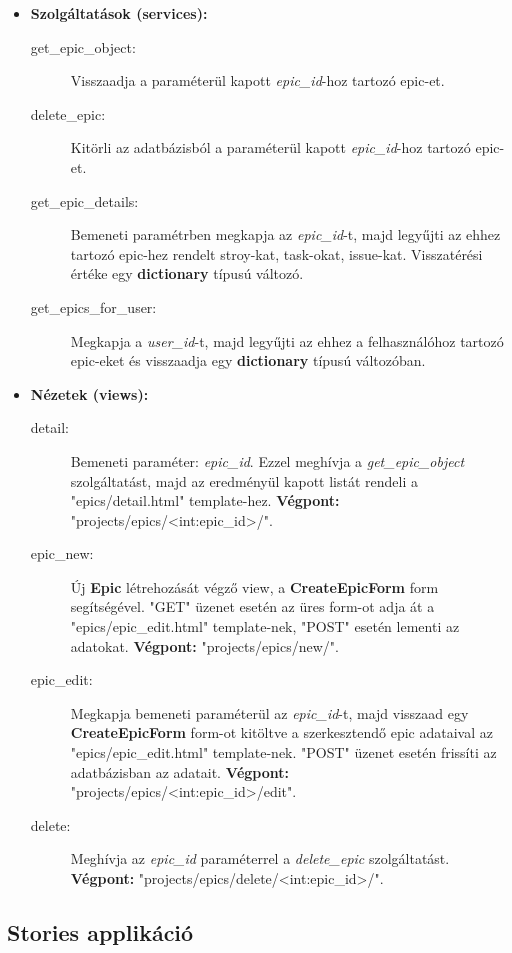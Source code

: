 \begin{itemize}
	\item \textbf{Szolgáltatások (services):}
	\begin{description}
		\item[get\_epic\_object:] Visszaadja a paraméterül kapott \textit{epic\_id}-hoz tartozó epic-et.
		\item[delete\_epic:] Kitörli az adatbázisból a paraméterül kapott \textit{epic\_id}-hoz tartozó epic-et.
		\item[get\_epic\_details:] Bemeneti paramétrben megkapja az  \textit{epic\_id}-t, majd legyűjti az ehhez tartozó epic-hez rendelt stroy-kat, task-okat, issue-kat. Visszatérési értéke egy \textbf{dictionary} típusú változó.
		\item[get\_epics\_for\_user:] Megkapja a \textit{user\_id}-t, majd legyűjti az ehhez a felhasználóhoz tartozó epic-eket és visszaadja egy \textbf{dictionary} típusú változóban.
	\end{description}
	\item \textbf{Nézetek (views):}
	\begin{description}
		\item[detail:] Bemeneti paraméter: \textit{epic\_id}. Ezzel meghívja a \textit{get\_epic\_object} szolgáltatást, majd az eredményül kapott listát rendeli a "epics/detail.html" template-hez. \textbf{Végpont:} "projects/epics/<int:epic\_id>/".
		\item[epic\_new:] Új \textbf{Epic} létrehozását végző view, a \textbf{CreateEpicForm} form segítségével. "GET" üzenet esetén az üres form-ot adja át a "epics/epic\_edit.html" template-nek, "POST" esetén lementi az adatokat. \textbf{Végpont:} "projects/epics/new/".
		\item[epic\_edit:] Megkapja bemeneti paraméterül az \textit{epic\_id}-t, majd visszaad egy \textbf{CreateEpicForm} form-ot kitöltve a szerkesztendő epic adataival az "epics/epic\_edit.html" template-nek. "POST" üzenet esetén frissíti az adatbázisban az adatait. \textbf{Végpont:} "projects/epics/<int:epic\_id>/edit".
		\item[delete:] Meghívja az \textit{epic\_id} paraméterrel a \textit{delete\_epic} szolgáltatást. \textbf{Végpont:} "projects/epics/delete/<int:epic\_id>/".
	\end{description}
\end{itemize}


\subsection{Stories applikáció}

